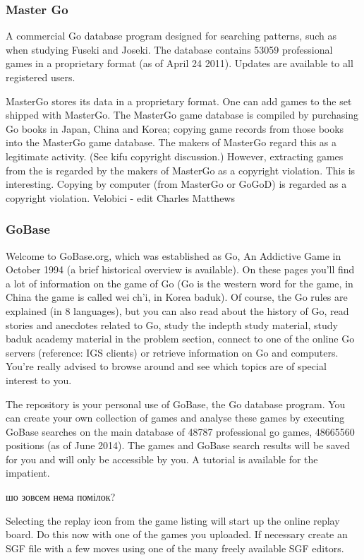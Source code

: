 \subsubsection{Master Go}
A commercial Go database program designed for searching patterns, such as when studying Fuseki and Joseki. The database contains 53059 professional games in a proprietary format (as of April 24 2011). Updates are available to all registered users.

MasterGo stores its data in a proprietary format. One can add games to the set shipped with MasterGo. The MasterGo game database is compiled by purchasing Go books in Japan, China and Korea; copying game records from those books into the MasterGo game database. The makers of MasterGo regard this as a legitimate activity. (See kifu copyright discussion.) However, extracting games from the is regarded by the makers of MasterGo as a copyright violation. This is interesting. Copying by computer (from MasterGo or GoGoD) is regarded as a copyright violation. Velobici - edit Charles Matthews
\subsubsection{GoBase}
Welcome to GoBase.org, which was established as Go, An Addictive Game in October 1994 (a brief historical overview is available). On these pages you'll find a lot of information on the game of Go (Go is the western word for the game, in China the game is called wei ch'i, in Korea baduk). Of course, the Go rules are explained (in 8 languages), but you can also read about the history of Go, read stories and anecdotes related to Go, study the indepth study material, study baduk academy material in the problem section, connect to one of the online Go servers (reference: IGS clients) or retrieve information on Go and computers. You're really advised to browse around and see which topics are of special interest to you. 

The repository is your personal use of GoBase, the Go database program. You can create your own collection of games and analyse these games by executing GoBase searches on the main database of 48787 professional go games, 48665560 positions (as of June 2014). The games and GoBase search results will be saved for you and will only be accessible by you. A tutorial is available for the impatient.

шо зовсем нема помілок?

Selecting the replay icon from the game listing will start up the online replay board. Do this now with one of the games you uploaded. If necessary create an SGF file with a few moves using one of the many freely available SGF editors.

